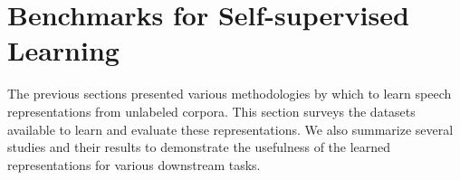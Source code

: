 
\section{Benchmarks for Self-supervised Learning}
\label{section:benchmark}





The previous sections presented various methodologies by which to learn speech
representations from unlabeled corpora. This section surveys the datasets
available to learn and evaluate these representations. We also summarize
several studies and their results to demonstrate the usefulness of the learned
representations for various downstream tasks. 

